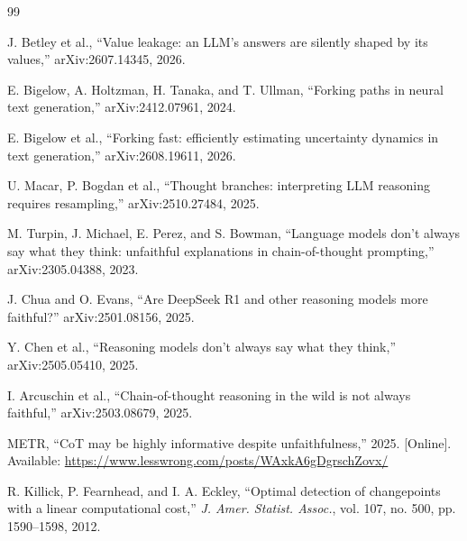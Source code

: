 \documentclass{article}
\begin{document}
\begin{thebibliography}{99}

J. Betley et al., ``Value leakage: an LLM's answers are silently shaped by its
values,'' arXiv:2607.14345, 2026.

E. Bigelow, A. Holtzman, H. Tanaka, and T. Ullman, ``Forking paths in neural
text generation,'' arXiv:2412.07961, 2024.

E. Bigelow et al., ``Forking fast: efficiently estimating uncertainty dynamics
in text generation,'' arXiv:2608.19611, 2026.

U. Macar, P. Bogdan et al., ``Thought branches: interpreting LLM reasoning
requires resampling,'' arXiv:2510.27484, 2025.

M. Turpin, J. Michael, E. Perez, and S. Bowman, ``Language models don't always
say what they think: unfaithful explanations in chain-of-thought prompting,''
arXiv:2305.04388, 2023.

J. Chua and O. Evans, ``Are DeepSeek R1 and other reasoning models more faithful?''
arXiv:2501.08156, 2025.

Y. Chen et al., ``Reasoning models don't always say what they think,''
arXiv:2505.05410, 2025.

I. Arcuschin et al., ``Chain-of-thought reasoning in the wild is not always
faithful,'' arXiv:2503.08679, 2025.

METR, ``CoT may be highly informative despite unfaithfulness,'' 2025.
[Online]. Available: \url{https://www.lesswrong.com/posts/WAxkA6gDgrschZovx/}

R. Killick, P. Fearnhead, and I. A. Eckley, ``Optimal detection of changepoints
with a linear computational cost,'' \emph{J. Amer. Statist. Assoc.}, vol. 107,
no. 500, pp. 1590--1598, 2012.

\end{thebibliography}
\end{document}
